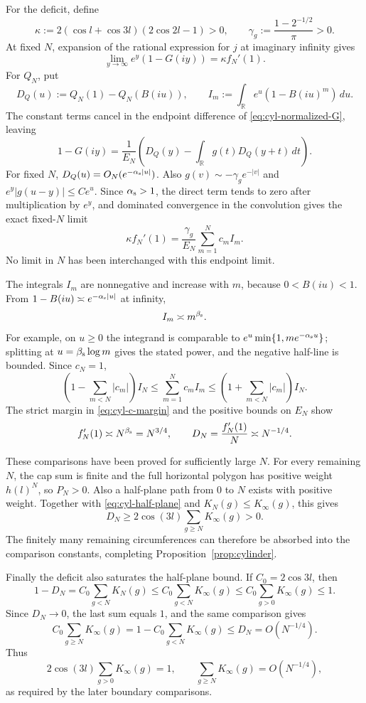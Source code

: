 For the deficit, define
\[
 \kappa:=2(\cos l+\cos3l)(2\cos2l-1)>0,\qquad
 \gamma_g:=\frac{1-2^{-1/2}}{\pi}>0.
\]
At fixed \(N\), expansion of the rational expression for \(j\) at
imaginary infinity gives
\[
 \lim_{y\to\infty}e^y(1-G(iy))=\kappa f_N'(1).
\]
For \(Q_N\), put
\[
 D_Q(u):=Q_N(1)-Q_N(B(iu)),\qquad
 I_m:=\int_{\mathbb R}e^u(1-B(iu)^m)\,du.
\]
The constant terms cancel in the endpoint difference of
\eqref{eq:cyl-normalized-G}, leaving
\[
 1-G(iy)=\frac1{E_N}
 \left(D_Q(y)-\int_{\mathbb R}g(t)D_Q(y+t)\,dt\right).
\]
For fixed \(N\), \(D_Q(u)=O_N(e^{-\alpha_{\rm s}|u|})\).
Also \(g(v)\sim-\gamma_g e^{-|v|}\) and
\(e^y|g(u-y)|\le Ce^u\).  Since \(\alpha_{\rm s}>1\), the direct
term tends to zero after multiplication by \(e^y\), and dominated
convergence in the convolution gives the exact fixed-\(N\) limit
\[
 \kappa f_N'(1)=\frac{\gamma_g}{E_N}
                    \sum_{m=1}^N c_m I_m.
\]
No limit in \(N\) has been interchanged with this endpoint limit.

The integrals \(I_m\) are nonnegative and increase with \(m\), because
\(0<B(iu)<1\).  From
\(1-B(iu)\asymp e^{-\alpha_{\rm s}|u|}\) at infinity,
\[
 I_m\asymp m^{\beta_{\rm s}}.
\]
For example, on \(u\ge0\) the integrand is comparable to
\(e^u\min\{1,m e^{-\alpha_{\rm s}u}\}\); splitting at
\(u=\beta_{\rm s}\log m\) gives the stated power, and the negative
half-line is bounded.  Since \(c_N=1\),
\[
 \left(1-\sum_{m<N}|c_m|\right)I_N
 \le\sum_{m=1}^N c_m I_m
 \le\left(1+\sum_{m<N}|c_m|\right)I_N.
\]
The strict margin in \eqref{eq:cyl-c-margin} and the positive bounds
on \(E_N\) show
\[
 f_N'(1)\asymp N^{\beta_{\rm s}}=N^{3/4},
 \qquad
 D_N=\frac{f_N'(1)}N\asymp N^{-1/4}.
\]

These comparisons have been proved for sufficiently large \(N\).
For every remaining \(N\), the cap sum is finite and the full
horizontal polygon has positive weight \(h(l)^N\), so \(P_N>0\).
Also a half-plane path from \(0\) to \(N\) exists with positive weight.
Together with \eqref{eq:cyl-half-plane} and \(K_N(g)\le K_\infty(g)\),
this gives
\[
 D_N\ge 2\cos(3l)\sum_{g\ge N}K_\infty(g)>0.
\]
The finitely many remaining circumferences can
therefore be absorbed into the comparison constants, completing
Proposition~\ref{prop:cylinder}.

Finally the deficit also saturates the half-plane bound.  If
\(C_0=2\cos3l\), then
\[
 1-D_N=C_0\sum_{g<N}K_N(g)
 \le C_0\sum_{g<N}K_\infty(g)
 \le C_0\sum_{g>0}K_\infty(g)\le1.
\]
Since \(D_N\to0\), the last sum equals \(1\), and the same comparison
gives
\[
 C_0\sum_{g\ge N}K_\infty(g)
 =1-C_0\sum_{g<N}K_\infty(g)
 \le D_N=O(N^{-1/4}).
\]
Thus
\[
 2\cos(3l)\sum_{g>0}K_\infty(g)=1,\qquad
 \sum_{g\ge N}K_\infty(g)=O(N^{-1/4}),
\]
as required by the later boundary comparisons.
